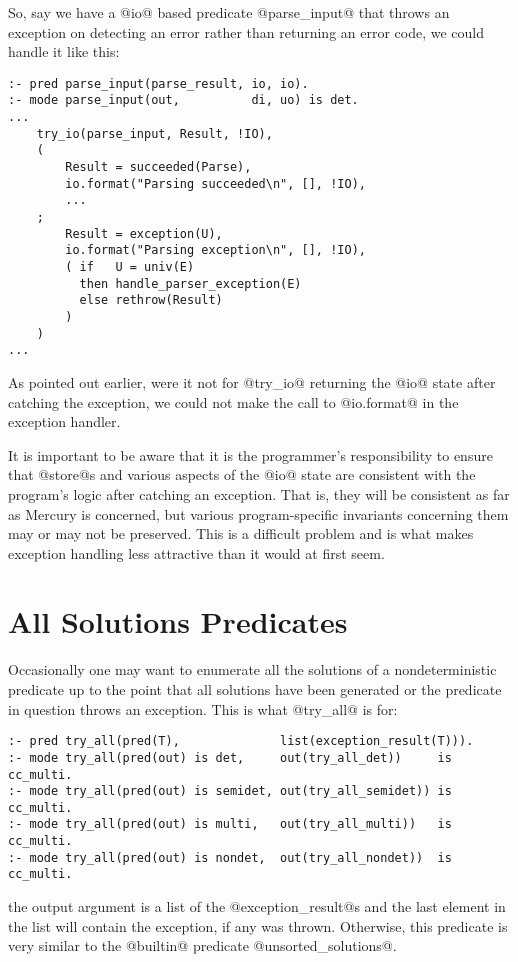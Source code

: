 So, say we have a @io@ based predicate @parse_input@ that throws
an exception on detecting an error rather than returning an error
code, we could handle it like this:
\begin{verbatim}
:- pred parse_input(parse_result, io, io).
:- mode parse_input(out,          di, uo) is det.
...
    try_io(parse_input, Result, !IO),
    (
        Result = succeeded(Parse),
        io.format("Parsing succeeded\n", [], !IO),
        ...
    ;
        Result = exception(U),
        io.format("Parsing exception\n", [], !IO),
        ( if   U = univ(E)
          then handle_parser_exception(E)
          else rethrow(Result)
        )
    )
...
\end{verbatim}
As pointed out earlier, were it not for @try_io@ returning the @io@
state after catching the exception, we could not make the call to
@io.format@ in the exception handler.

It is important to be aware that it is the programmer's
responsibility to ensure that @store@s and various aspects of the
@io@ state are consistent with the program's logic after catching
an exception.  That is, they will be consistent as far as Mercury
is concerned, but various program-specific invariants concerning
them may or may not be preserved.  This is a difficult problem
and is what makes exception handling less attractive than it would
at first seem.

\section{All Solutions Predicates}

Occasionally one may want to enumerate all the solutions of a
nondeterministic predicate up to the point that all solutions
have been generated or the predicate in question throws an
exception.  This is what @try_all@ is for:
\begin{verbatim}
:- pred try_all(pred(T),              list(exception_result(T))).
:- mode try_all(pred(out) is det,     out(try_all_det))     is cc_multi.
:- mode try_all(pred(out) is semidet, out(try_all_semidet)) is cc_multi.
:- mode try_all(pred(out) is multi,   out(try_all_multi))   is cc_multi.
:- mode try_all(pred(out) is nondet,  out(try_all_nondet))  is cc_multi.
\end{verbatim}
the output argument is a list of the @exception_result@s and the last
element in the list will contain the exception, if any was thrown.
Otherwise, this predicate is very similar to the @builtin@
predicate @unsorted_solutions@.


